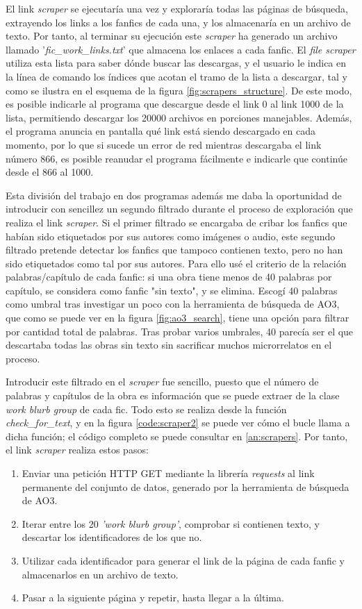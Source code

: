 \documentclass{pre-tfg}
\newcommand{\refToLinkScraperCode}{\ref{an:scrapers}}
\begin{document}
El link \textit{scraper} se ejecutaría una vez y exploraría todas las páginas de búsqueda, extrayendo los links a los fanfics de cada una, y los almacenaría en un archivo de texto. Por tanto, al terminar su ejecución este \textit{scraper} ha generado un archivo llamado '\textit{fic\_work\_links.txt}' que almacena los enlaces a cada fanfic. El \textit{file scraper} utiliza esta lista para saber dónde buscar las descargas, y el usuario le indica en la línea de comando los índices que acotan el tramo de la lista a descargar, tal y como se ilustra en el esquema de la figura \ref{fig:scrapers_structure}. De este modo, es posible indicarle al programa que descargue desde el link 0 al link 1000 de la lista, permitiendo descargar los 20000 archivos en porciones manejables. Además, el programa anuncia en pantalla qué link está siendo descargado en cada momento, por lo que si sucede un error de red mientras descargaba el link número 866, es posible reanudar el programa fácilmente e indicarle que continúe desde el 866 al 1000.

Esta división del trabajo en dos programas además me daba la oportunidad de introducir con sencillez un segundo filtrado durante el proceso de exploración que realiza el link \textit{scraper}. Si el primer filtrado se encargaba de cribar los fanfics que habían sido etiquetados por sus autores como imágenes o audio, este segundo filtrado pretende detectar los fanfics que tampoco contienen texto, pero no han sido etiquetados como tal por sus autores. Para ello usé el criterio de la relación palabras/capítulo de cada fanfic: si una obra tiene menos de 40 palabras por capítulo, se considera como fanfic "sin texto", y se elimina. Escogí 40 palabras como umbral tras investigar un poco con la herramienta de búsqueda de AO3, que como se puede ver en la figura \ref{fig:ao3_search}, tiene una opción para filtrar por cantidad total de palabras. Tras probar varios umbrales, 40 parecía ser el que descartaba todas las obras sin texto sin sacrificar muchos microrrelatos en el proceso.

Introducir este filtrado en el \textit{scraper} fue sencillo, puesto que el número de palabras y capítulos de la obra es información que se puede extraer de la clase \textit{work blurb group} de cada fic. Todo esto se realiza desde la función \textit{check\_for\_text}, y en la figura \ref{code:scraper2} se puede ver cómo el bucle llama a dicha función; el código completo se puede consultar en \refToLinkScraperCode. Por tanto, el link \textit{scraper} realiza estos pasos:
\begin{enumerate}
	\item Enviar una petición HTTP GET mediante la librería \textit{requests} al link permanente del conjunto de datos, generado por la herramienta de búsqueda de AO3.
	\item Iterar entre los 20 \textit{'work blurb group'}, comprobar si contienen texto, y descartar los identificadores de los que no.
	\item Utilizar cada identificador para generar el link de la página de cada fanfic y almacenarlos en un archivo de texto.
	\item Pasar a la siguiente página y repetir, hasta llegar a la última.
\end{enumerate}
\end{document}
